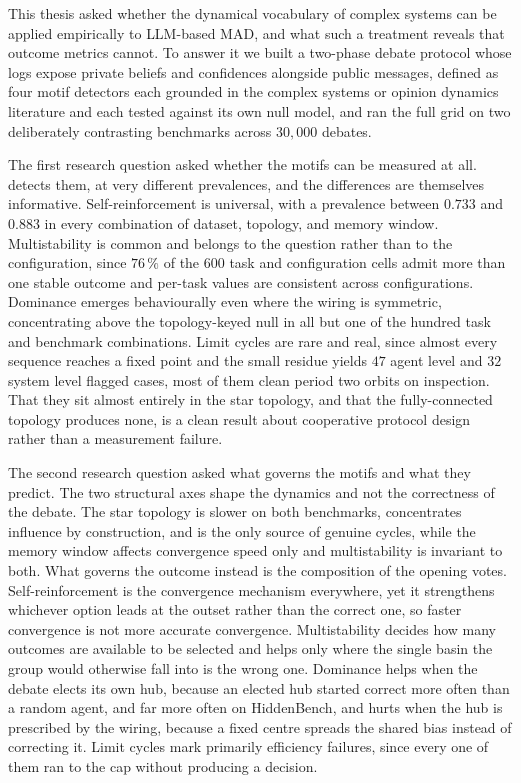This thesis asked whether the dynamical vocabulary of complex systems can be
applied empirically to \ac{LLM}-based \ac{MAD}, and what such a treatment
reveals that outcome metrics cannot. To answer it we built a two-phase debate
protocol whose logs expose private beliefs and confidences alongside public
messages, defined \suitename{} as four motif detectors each grounded in the
complex systems or opinion dynamics literature and each tested against its own
null model, and ran the full grid on two deliberately contrasting benchmarks
across $30{,}000$ debates.

The first research question asked whether the motifs can be measured at all.
\suitename{} detects them, at very different prevalences, and the differences are
themselves informative. Self-reinforcement is universal, with a prevalence
between $0.733$ and $0.883$ in every combination of dataset, topology, and memory
window. Multistability is common and belongs to the question rather than to the
configuration, since $76\,\%$ of the $600$ task and configuration cells admit more
than one stable outcome and per-task values are consistent across configurations.
Dominance emerges behaviourally even where the wiring is symmetric, concentrating
above the topology-keyed null in all but one of the hundred task and benchmark
combinations. Limit cycles are rare and real, since almost every sequence reaches
a fixed point and the small residue yields $47$ agent level and $32$ system level
flagged cases, most of them clean period two orbits on inspection. That they sit
almost entirely in the star topology, and that the fully-connected topology
produces none, is a clean result about cooperative protocol design rather than a
measurement failure.

The second research question asked what governs the motifs and what they predict.
The two structural axes shape the dynamics and not the correctness of the debate.
The star topology is slower on both benchmarks, concentrates influence by
construction, and is the only source of genuine cycles, while the memory window
affects convergence speed only and multistability is invariant to both. What
governs the outcome instead is the composition of the opening votes.
Self-reinforcement is the convergence mechanism everywhere, yet it strengthens
whichever option leads at the outset rather than the correct one, so faster
convergence is not more accurate convergence. Multistability decides how many
outcomes are available to be selected and helps only where the single basin the
group would otherwise fall into is the wrong one. Dominance helps when the debate
elects its own hub, because an elected hub started correct more often than a
random agent, and far more often on HiddenBench, and hurts when the hub is prescribed by the wiring, because a fixed
centre spreads the shared bias instead of correcting it. Limit cycles mark primarily
efficiency failures, since every one of them ran to the cap without producing a
decision.

